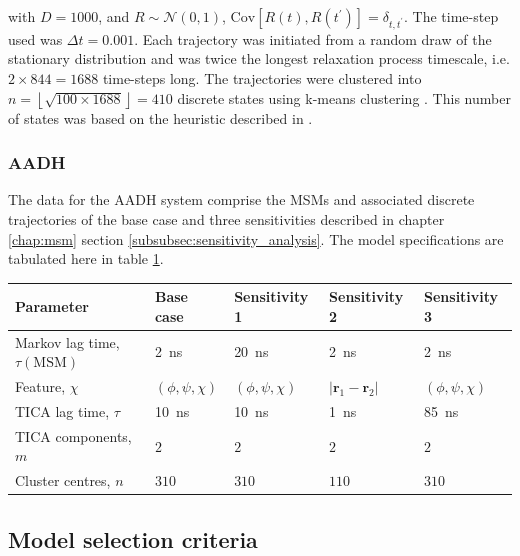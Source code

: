 with $D = 1000$, and $R\sim \mathcal{N}(0, 1)$, $\mathrm{Cov}\left[R(t), R(t^{\prime})\right]=\delta_{t, t^{\prime}}$. The time-step used was $\Delta t = 0.001$.  Each trajectory was initiated from a random draw of the stationary distribution and was twice the longest relaxation process timescale, i.e. $2\times 844=1688$ time-steps long. The trajectories were clustered into $n = \left\lfloor\sqrt{100\times 1688}\right\rfloor =410$ discrete states using k-means clustering \cite{friedman2001elements}. This number of states was based on the heuristic described in \cite{husicWardClusteringImproves2017a}.


\subsubsection{AADH}
The data for the AADH system comprise the MSMs and associated discrete trajectories of the base case and three sensitivities described in chapter \ref{chap:msm} section \ref{subsubsec:sensitivity_analysis}. The model specifications are tabulated here in table \ref{tab:aadh_final_msm_specs}. 

\begin{table}
    \centering
    \begin{tabular}{|l|l|l|l|l|}
        \hline
        Parameter & Base case & Sensitivity 1 & Sensitivity 2 & Sensitivity 3 \\
        \hline\hline
        Markov lag time, $\tau(\textrm{MSM})$ & \SI{2}{\nano\second} &  \SI{20}{\nano\second}& \SI{2}{\nano\second}& \SI{2}{\nano\second} \\
        Feature, $\chi$ & $(\phi, \psi, \chi)$ & $(\phi, \psi, \chi)$ & $|\mathbf{r}_{1}-\mathbf{r}_2|$ & $(\phi, \psi, \chi)$ \\
        TICA lag time, $\tau$ & \SI{10}{\nano\second} & \SI{10}{\nano\second}&\SI{1}{\nano\second} &\SI{85}{\nano\second} \\
        TICA components, $m$ & $2$ & $2$ & $2$ & $2$ \\
        Cluster centres, $n$ & $310$ & $310$ & $110$ & $310$ \\
        \hline
    \end{tabular}
    \label{tab:aadh_final_msm_specs}
\end{table}

\subsection{Model selection criteria}

